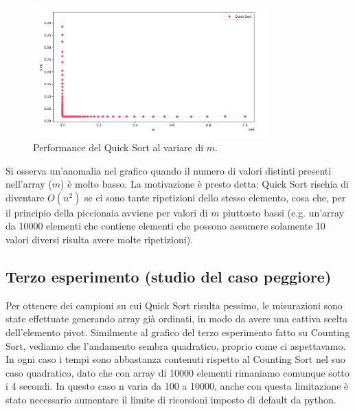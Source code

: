 \documentclass[a4paper, 12pt, oneside]{book}
\begin{document}
\begin{figure}[H]
    \centering
    \includegraphics[width=0.8\textwidth]{images/grafico_quick_sort_m.png}
    \caption{Performance del Quick Sort al variare di \(m\).}
    \label{fig:quick_sort_m}
\end{figure}

\noindent Si osserva un'anomalia nel grafico quando il numero di valori distinti presenti nell'array (\(m\)) è molto basso. La motivazione è presto detta: Quick Sort rischia di diventare $O(n^2)$ se ci sono tante ripetizioni dello stesso elemento, cosa che, per il principio della piccionaia avviene per valori di $m$ piuttosto bassi (e.g. un'array da 10000 elementi che contiene elementi che possono assumere solamente 10 valori diversi risulta avere molte ripetizioni).

\subsection{Terzo esperimento (studio del caso peggiore)}

Per ottenere dei campioni su cui Quick Sort risulta pessimo, le misurazioni sono state effettuate generando array già ordinati, in modo da avere una cattiva scelta dell'elemento pivot. Similmente al grafico del terzo esperimento fatto su Counting Sort, vediamo che l'andamento sembra quadratico, proprio come ci aspettavamo. In ogni caso i tempi sono abbastanza contenuti rispetto al Counting Sort nel suo caso quadratico, dato che con array di 10000 elementi rimaniamo comunque sotto i 4 secondi. In questo caso n varia da 100 a 10000, anche con questa limitazione è stato necessario aumentare il limite di ricorsioni imposto di default da python.
\end{document}
